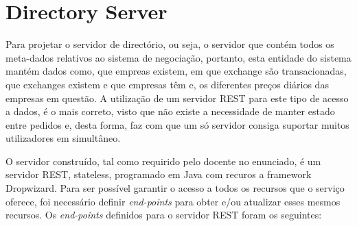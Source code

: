 \documentclass[a4paper,12pt]{article}
\begin{document}
\section{Directory Server}
Para projetar o servidor de directório, ou seja, o servidor que contém todos os meta-dados relativos ao sistema de negociação, portanto, esta entidade do sistema mantém dados como, que empreas existem, em que exchange são transacionadas, que exchanges existem e que empresas têm e, os diferentes preços diários das empresas em questão. A utilização de um servidor REST para este tipo de acesso a dados, é o mais correto, visto que não existe a necessidade de manter estado entre pedidos e, desta forma, faz com que um só servidor consiga suportar muitos utilizadores em simultâneo.
\par O servidor construído, tal como requirido pelo docente no enunciado, é um servidor REST, stateless, programado em Java com recuros a framework Dropwizard. Para ser possível garantir o acesso a todos os recursos que o serviço oferece, foi necessário definir \textit{end-points} para obter e/ou atualizar esses mesmos recursos. Os \textit{end-points} definidos para o servidor REST foram os seguintes:
\end{document}
